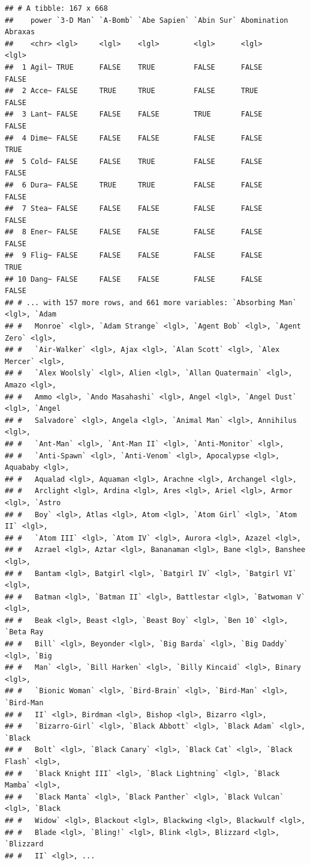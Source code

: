 \documentclass[]{book}
\begin{document}
\begin{verbatim}
## # A tibble: 167 x 668
##    power `3-D Man` `A-Bomb` `Abe Sapien` `Abin Sur` Abomination Abraxas
##    <chr> <lgl>     <lgl>    <lgl>        <lgl>      <lgl>       <lgl>  
##  1 Agil~ TRUE      FALSE    TRUE         FALSE      FALSE       FALSE  
##  2 Acce~ FALSE     TRUE     TRUE         FALSE      TRUE        FALSE  
##  3 Lant~ FALSE     FALSE    FALSE        TRUE       FALSE       FALSE  
##  4 Dime~ FALSE     FALSE    FALSE        FALSE      FALSE       TRUE   
##  5 Cold~ FALSE     FALSE    TRUE         FALSE      FALSE       FALSE  
##  6 Dura~ FALSE     TRUE     TRUE         FALSE      FALSE       FALSE  
##  7 Stea~ FALSE     FALSE    FALSE        FALSE      FALSE       FALSE  
##  8 Ener~ FALSE     FALSE    FALSE        FALSE      FALSE       FALSE  
##  9 Flig~ FALSE     FALSE    FALSE        FALSE      FALSE       TRUE   
## 10 Dang~ FALSE     FALSE    FALSE        FALSE      FALSE       FALSE  
## # ... with 157 more rows, and 661 more variables: `Absorbing Man` <lgl>, `Adam
## #   Monroe` <lgl>, `Adam Strange` <lgl>, `Agent Bob` <lgl>, `Agent Zero` <lgl>,
## #   `Air-Walker` <lgl>, Ajax <lgl>, `Alan Scott` <lgl>, `Alex Mercer` <lgl>,
## #   `Alex Woolsly` <lgl>, Alien <lgl>, `Allan Quatermain` <lgl>, Amazo <lgl>,
## #   Ammo <lgl>, `Ando Masahashi` <lgl>, Angel <lgl>, `Angel Dust` <lgl>, `Angel
## #   Salvadore` <lgl>, Angela <lgl>, `Animal Man` <lgl>, Annihilus <lgl>,
## #   `Ant-Man` <lgl>, `Ant-Man II` <lgl>, `Anti-Monitor` <lgl>,
## #   `Anti-Spawn` <lgl>, `Anti-Venom` <lgl>, Apocalypse <lgl>, Aquababy <lgl>,
## #   Aqualad <lgl>, Aquaman <lgl>, Arachne <lgl>, Archangel <lgl>,
## #   Arclight <lgl>, Ardina <lgl>, Ares <lgl>, Ariel <lgl>, Armor <lgl>, `Astro
## #   Boy` <lgl>, Atlas <lgl>, Atom <lgl>, `Atom Girl` <lgl>, `Atom II` <lgl>,
## #   `Atom III` <lgl>, `Atom IV` <lgl>, Aurora <lgl>, Azazel <lgl>,
## #   Azrael <lgl>, Aztar <lgl>, Bananaman <lgl>, Bane <lgl>, Banshee <lgl>,
## #   Bantam <lgl>, Batgirl <lgl>, `Batgirl IV` <lgl>, `Batgirl VI` <lgl>,
## #   Batman <lgl>, `Batman II` <lgl>, Battlestar <lgl>, `Batwoman V` <lgl>,
## #   Beak <lgl>, Beast <lgl>, `Beast Boy` <lgl>, `Ben 10` <lgl>, `Beta Ray
## #   Bill` <lgl>, Beyonder <lgl>, `Big Barda` <lgl>, `Big Daddy` <lgl>, `Big
## #   Man` <lgl>, `Bill Harken` <lgl>, `Billy Kincaid` <lgl>, Binary <lgl>,
## #   `Bionic Woman` <lgl>, `Bird-Brain` <lgl>, `Bird-Man` <lgl>, `Bird-Man
## #   II` <lgl>, Birdman <lgl>, Bishop <lgl>, Bizarro <lgl>,
## #   `Bizarro-Girl` <lgl>, `Black Abbott` <lgl>, `Black Adam` <lgl>, `Black
## #   Bolt` <lgl>, `Black Canary` <lgl>, `Black Cat` <lgl>, `Black Flash` <lgl>,
## #   `Black Knight III` <lgl>, `Black Lightning` <lgl>, `Black Mamba` <lgl>,
## #   `Black Manta` <lgl>, `Black Panther` <lgl>, `Black Vulcan` <lgl>, `Black
## #   Widow` <lgl>, Blackout <lgl>, Blackwing <lgl>, Blackwulf <lgl>,
## #   Blade <lgl>, `Bling!` <lgl>, Blink <lgl>, Blizzard <lgl>, `Blizzard
## #   II` <lgl>, ...
\end{verbatim}


\end{document}
